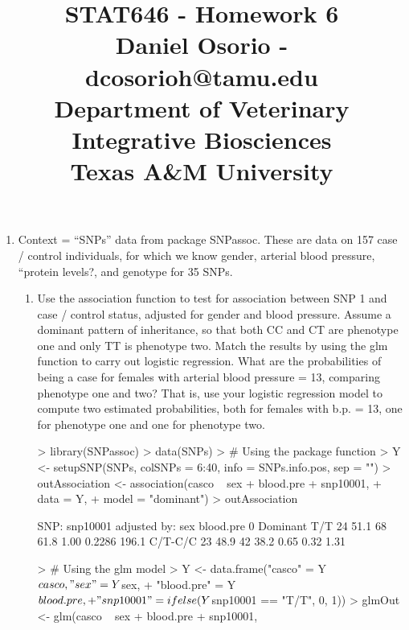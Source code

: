 \documentclass[12pt,a4paper]{paper}
\begin{document}
\title{STAT646 - Homework 6\\\small{Daniel Osorio - dcosorioh@tamu.edu\\Department of Veterinary Integrative Biosciences\\Texas A\&M University}}
\maketitle

\begin{enumerate}
\item Context = “SNPs” data from package SNPassoc. These are data on 157 case / control individuals, for which we know gender, arterial blood pressure, “protein levels?, and genotype for 35 SNPs.
\begin{enumerate}
\item Use the association function to test for association between SNP 1 and case / control status, adjusted for gender and blood pressure. Assume a dominant pattern of inheritance, so that both CC and CT are phenotype one and only TT is phenotype two. Match the results by using the glm function to carry out logistic regression. What are the probabilities of being a case for females with arterial blood pressure = 13, comparing phenotype one and two? That is, use your logistic regression model to compute two estimated probabilities, both for females with b.p. = 13, one for phenotype one and one for phenotype two.
\begin{Schunk}
\begin{Sinput}
> library(SNPassoc)
> data(SNPs)
> # Using the package function
> Y <- setupSNP(SNPs, colSNPs = 6:40, info = SNPs.info.pos, sep = "")
> outAssociation <- association(casco ~ sex + blood.pre + snp10001, 
+                          data = Y, 
+                          model = "dominant")
> outAssociation
\end{Sinput}
\begin{Soutput}
SNP: snp10001  adjusted by: sex blood.pre 
          0    %  1    %   OR lower upper p-value   AIC
Dominant                                               
T/T      24 51.1 68 61.8 1.00              0.2286 196.1
C/T-C/C  23 48.9 42 38.2 0.65  0.32  1.31              
\end{Soutput}
\begin{Sinput}
> # Using the glm model 
> Y <- data.frame("casco" = Y$casco, "sex" = Y$sex, 
+                 "blood.pre" = Y$blood.pre,
+                 "snp10001" = ifelse(Y$snp10001 == "T/T", 0, 1))
> glmOut <- glm(casco ~ sex + blood.pre + snp10001, 

\end{Sinput}
\end{Schunk}
\end{enumerate}
\end{enumerate}
\end{document}
